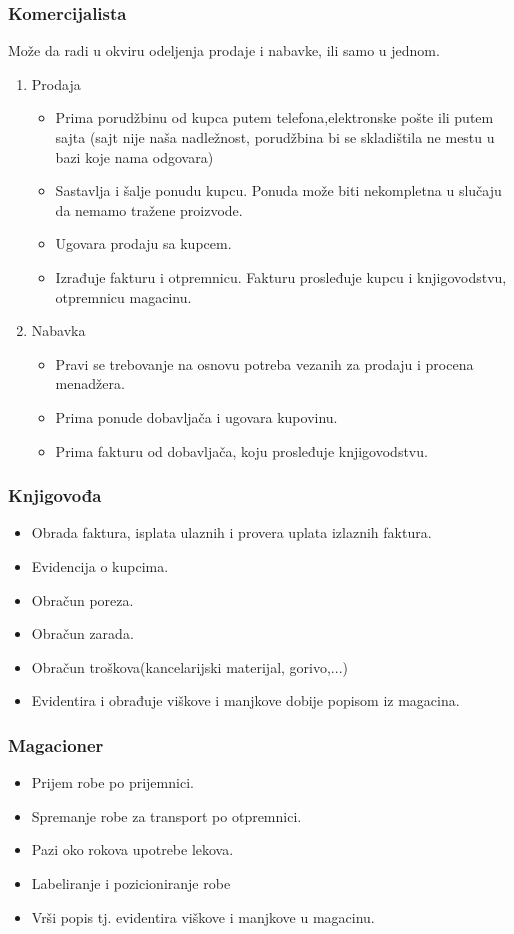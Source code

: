 \subsubsection{Komercijalista}
Može da radi u okviru odeljenja prodaje i nabavke, ili samo u jednom.
\begin{enumerate}
\item Prodaja
\begin{itemize}
\item Prima porudžbinu od kupca putem telefona,elektronske pošte ili putem sajta (sajt nije naša nadležnost, porudžbina bi se skladištila ne mestu u bazi koje nama odgovara)
\item Sastavlja i šalje ponudu kupcu. Ponuda može biti nekompletna u slučaju da nemamo tražene proizvode. 
\item Ugovara prodaju sa kupcem.
\item Izrađuje fakturu i otpremnicu. Fakturu prosleđuje kupcu i knjigovodstvu, otpremnicu magacinu.
\end{itemize}
\item Nabavka 
\begin{itemize}
\item Pravi se trebovanje na osnovu potreba vezanih za prodaju i procena menadžera.
\item Prima ponude dobavljača i ugovara kupovinu.
\item Prima fakturu od dobavljača, koju prosleđuje knjigovodstvu.
\end{itemize}
\end{enumerate}

\subsubsection{Knjigovođa}
\begin{itemize}
\item Obrada faktura, isplata ulaznih i provera uplata izlaznih faktura.
\item Evidencija o kupcima.
\item Obračun poreza.
\item Obračun zarada.
\item Obračun troškova(kancelarijski materijal, gorivo,...)
\item Evidentira i obrađuje viškove i manjkove dobije popisom iz magacina.
\end{itemize}

\subsubsection{Magacioner}
\begin{itemize}
\item Prijem robe po prijemnici.
\item Spremanje robe za transport po otpremnici.
\item Pazi oko rokova upotrebe lekova.
\item Labeliranje i pozicioniranje robe
\item Vrši popis tj. evidentira viškove i manjkove u magacinu.
\end{itemize}

